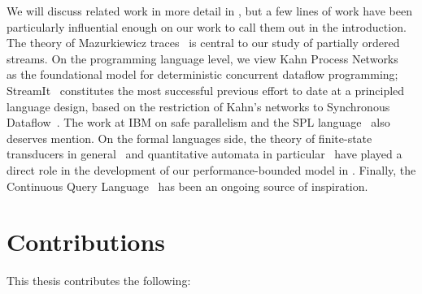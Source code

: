 We will discuss related work in more detail in , but a few lines of work have been particularly influential enough on our work to call them out in the introduction.
The theory of Mazurkiewicz traces~\cite{mazurkiewicz1986trace,DiekertR1995} is central to our study of partially ordered streams.
On the programming language level, we view Kahn Process Networks~\cite{gilles1974semantics} as the foundational model for deterministic concurrent dataflow programming; StreamIt~\cite{thies2002streamit} constitutes the most successful previous effort to date at a principled language design, based on the restriction of Kahn's networks to Synchronous Dataflow~\cite{lee1987synchronous}.
The work at IBM on safe parallelism and the SPL language~\cite{HAG2013SPL,schneider2013safe,hirzel2014catalog} also deserves mention.
On the formal languages side,
the theory of finite-state transducers in general~\cite{EH2001MDST,AC2010SST}
and quantitative automata in particular~\cite{S1961WA,DKV2009HWA,AdADRY2013CRA}
have played a direct role in the development of our performance-bounded
model in .
Finally, the Continuous Query Language~\cite{CQL,ABW2006CQL} has been an ongoing source of inspiration.

\section{Contributions}

This thesis contributes the following:

